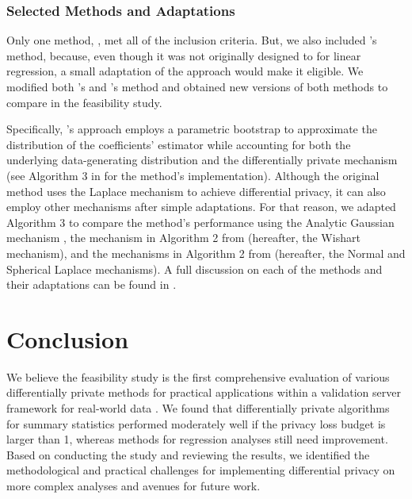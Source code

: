 \subsubsection{Selected Methods and Adaptations}\label{subsubsec:reg_meth}
Only one method, \cite{ferrando2020general}, met all of the inclusion criteria. But, we also included \cite{brawner2018bootstrap}'s method, because, even though it was not originally designed to for linear regression, a small adaptation of the approach would make it eligible. We modified both \cite{ferrando2020general}'s and \cite{brawner2018bootstrap}'s method and obtained new versions of both methods to compare in the feasibility study. 

Specifically, \cite{ferrando2020general}'s approach employs a parametric bootstrap to approximate the distribution of the coefficients' estimator while accounting for both the underlying data-generating distribution and the differentially private mechanism (see Algorithm 3 in \cite{ferrando2020general} for the method's implementation). Although the original method uses the Laplace mechanism to achieve differential privacy, it can also employ other mechanisms after simple adaptations. For that reason, we adapted Algorithm 3 to compare the method's performance using the Analytic Gaussian mechanism \cite{balle2018improving}, the mechanism in Algorithm 2 from \cite{sheffet2019old} (hereafter, the Wishart mechanism), and the mechanisms in Algorithm 2 from \cite{wang2019differentially} (hereafter, the Normal and Spherical Laplace mechanisms). A full discussion on each of the methods and their adaptations can be found in \cite{barrientos2021}.


\section{Conclusion}\label{sec:conclusion}
We believe the feasibility study is the first comprehensive evaluation of various differentially private methods for practical applications within a validation server framework for real-world data \autocite{barrientos2021}. We found that differentially private algorithms for summary statistics performed moderately well if the privacy loss budget is larger than 1, whereas methods for regression analyses still need improvement. Based on conducting the study and reviewing the results, we identified the methodological and practical challenges for implementing differential privacy on more complex analyses and avenues for future work.

